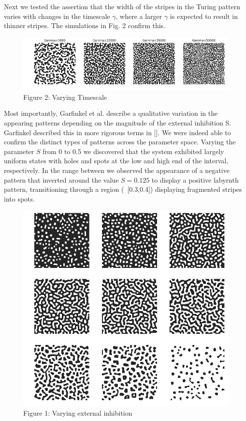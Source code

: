 \documentclass{article}
\begin{document}
Next we tested the assertion that the width of the stripes in the Turing pattern varies with changes in the timescale $\gamma$, where a larger $\gamma$ is expected to result in thinner stripes. The simulations in Fig. 2 confirm this.

\begin{figure}[H]
  \includegraphics[width=\linewidth]{timescale.png}
  \caption{Figure 2: Varying Timescale}
  \label{fig:gamma}
\end{figure}

Most importantly, Garfinkel et al. describe a qualitative variation in the appearing patterns depending on the magnitude of the external inhibition S. Garfinkel described this in more rigorous terms in []. We were indeed able to confirm the distinct types of patterns across the parameter space. Varying the parameter $S$ from 0 to 0.5 we discovered that the system exhibited largely uniform states with holes and spots at the low and high end of the interval, respectively. In the range between we observed the appearance of a negative pattern that inverted around the value $S=0.125$ to display a positive labyrnth pattern, transitioning through a region (~[0.3,0.4]) displaying fragmented stripes into spots.

\begin{figure}
  \includegraphics[width=\linewidth]{inhibition.png}
  \caption{Figure 1: Varying external inhibition}
  \label{fig:s}
\end{figure}
\end{document}
